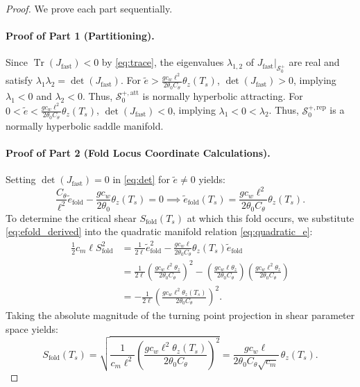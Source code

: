 \begin{proof}
We prove each part sequentially.

\paragraph{Proof of Part 1 (Partitioning).}
Since $\operatorname{Tr}(J_{\mathrm{fast}}) < 0$ by \eqref{eq:trace}, the eigenvalues $\lambda_{1,2}$ of $\left. J_{\mathrm{fast}} \right|_{\mathcal{S}_0^+}$ are real and satisfy $\lambda_1 \lambda_2 = \det(J_{\mathrm{fast}})$.
For $\tilde e > \frac{g c_w \ell^2}{2\theta_0 C_\theta} \theta_z(T_s)$, $\det(J_{\mathrm{fast}}) > 0$, implying $\lambda_1 < 0$ and $\lambda_2 < 0$. Thus, $\mathcal{S}_0^{+,\mathrm{att}}$ is normally hyperbolic attracting.
For $0 < \tilde e < \frac{g c_w \ell^2}{2\theta_0 C_\theta} \theta_z(T_s)$, $\det(J_{\mathrm{fast}}) < 0$, implying $\lambda_1 < 0 < \lambda_2$. Thus, $\mathcal{S}_0^{+,\mathrm{rep}}$ is a normally hyperbolic saddle manifold.

\paragraph{Proof of Part 2 (Fold Locus Coordinate Calculations).}
Setting $\det(J_{\mathrm{fast}}) = 0$ in \eqref{eq:det} for $\tilde e \neq 0$ yields:
\begin{equation}
\frac{C_\theta}{\ell^2} \tilde e_{\mathrm{fold}} - \frac{g c_w}{2\theta_0} \theta_z(T_s) = 0 \implies \tilde e_{\mathrm{fold}}(T_s) = \frac{g c_w \ell^2}{2\theta_0 C_\theta} \theta_z(T_s).
\label{eq:efold_derived}
\end{equation}
To determine the critical shear $S_{\mathrm{fold}}(T_s)$ at which this fold occurs, we substitute \eqref{eq:efold_derived} into the quadratic manifold relation \eqref{eq:quadratic_e}:
\begin{align}
\frac{1}{2} c_m \ell S_{\mathrm{fold}}^2 &= \frac{1}{2\ell} \tilde e_{\mathrm{fold}}^2 - \frac{g c_w \ell}{2\theta_0 C_\theta} \theta_z(T_s) \tilde e_{\mathrm{fold}} \nonumber \\
&= \frac{1}{2\ell} \left( \frac{g c_w \ell^2 \theta_z}{2\theta_0 C_\theta} \right)^2 - \left( \frac{g c_w \ell \theta_z}{2\theta_0 C_\theta} \right) \left( \frac{g c_w \ell^2 \theta_z}{2\theta_0 C_\theta} \right) \nonumber \\
&= -\frac{1}{2\ell} \left( \frac{g c_w \ell^2 \theta_z(T_s)}{2\theta_0 C_\theta} \right)^2.
\end{align}
Taking the absolute magnitude of the turning point projection in shear parameter space yields:
\begin{equation}
S_{\mathrm{fold}}(T_s) = \sqrt{ \frac{1}{c_m \ell^2} \left( \frac{g c_w \ell^2 \theta_z(T_s)}{2\theta_0 C_\theta} \right)^2 } = \frac{g c_w \ell}{2\theta_0 C_\theta \sqrt{c_m}} \, \theta_z(T_s).
\end{equation}


\end{proof}

